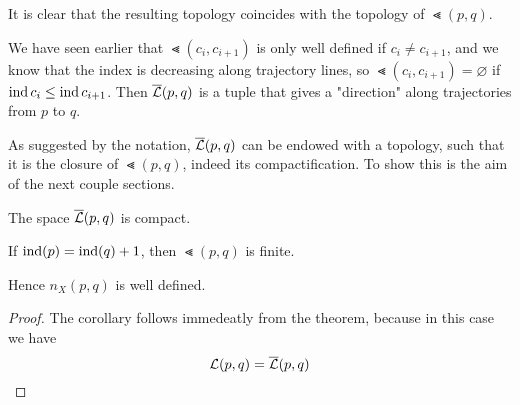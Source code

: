 It is clear 
that the resulting topology coincides with the topology
of $\Lt(p, q)$. 

\begin{remark}
    We have seen earlier that $\Lt(c_i, c_{i+1})$ is only well defined if 
    $c_i \neq c_{i + 1}$, and we know that the index is decreasing along trajectory lines,
    so $\Lt(c_i, c_{i+1}) = \varnothing$ if ${ \operatorname{ind} } \, c_i \leq { \operatorname{ind} } \, c_{i + 1}$.
    Then ${\overline{\mathcal{L}} }(p, q)$ is a tuple that gives a "direction" along trajectories
    from $p$ to $q$.
\end{remark}

As suggested by the notation, ${\overline{\mathcal{L}} }(p, q)$ can be endowed with a topology, such that 
it is the closure of $\Lt(p, q)$, indeed its compactification. 
To show this is the aim of the next couple sections.

\begin{theorem}
    The space ${\overline{\mathcal{L}} }(p, q)$ is compact.
\end{theorem}

\begin{corollary}
    If ${ \operatorname{ind} }(p) = { \operatorname{ind} }(q) + 1$, then $\Lt(p, q)$ is finite.
\end{corollary}

\begin{remark}
    Hence $n_X(p, q)$ is well defined.
\end{remark}

\begin{proof}
    The corollary follows immedeatly from the theorem, because in this case we have
    \[ { \mathcal{L} }(p, q) = {\overline{\mathcal{L}} }(p, q) \]
\end{proof}

